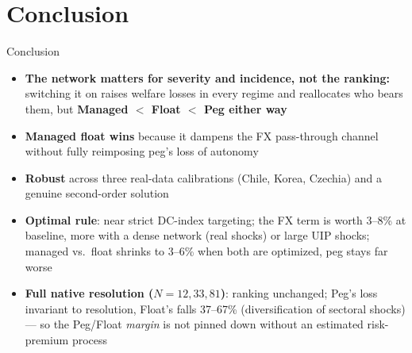 \documentclass[aspectratio=43, 10pt]{beamer}
\begin{document}
\section{Conclusion}
\begin{frame}[plain]{Conclusion}

{\footnotesize
\begin{itemize}\setlength{\itemsep}{6pt}
\item \textbf{The network matters for severity and incidence, not the ranking:} switching it on raises welfare losses in every regime and reallocates who bears them, but \textbf{Managed $<$ Float $<$ Peg either way}
\item \textbf{Managed float wins} because it dampens the FX pass-through channel without fully reimposing peg's loss of autonomy
\item \textbf{Robust} across three real-data calibrations (Chile, Korea, Czechia) and a genuine second-order solution
\item \textbf{Optimal rule}: near strict DC-index targeting; the FX term is worth 3--8\% at baseline, more with a dense network (real shocks) or large UIP shocks; managed vs.\ float shrinks to 3--6\% when both are optimized, peg stays far worse
\item \textbf{Full native resolution ($N=12,33,81$)}: ranking unchanged; Peg's loss invariant to resolution, Float's falls 37--67\% (diversification of sectoral shocks) --- so the Peg/Float \emph{margin} is not pinned down without an estimated risk-premium process
\end{itemize}}

\end{frame}

% 
\end{document}
